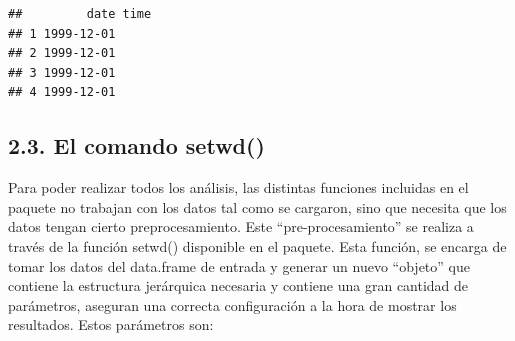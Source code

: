 \documentclass[]{article}
\begin{document}
\begin{verbatim}
##         date time
## 1 1999-12-01     
## 2 1999-12-01     
## 3 1999-12-01     
## 4 1999-12-01
\end{verbatim}

\subsection{2.3. El comando setwd()}\label{el-comando-setwd}

Para poder realizar todos los análisis, las distintas funciones
incluidas en el paquete no trabajan con los datos tal como se cargaron,
sino que necesita que los datos tengan cierto preprocesamiento. Este
``pre-procesamiento'' se realiza a través de la función setwd()
disponible en el paquete. Esta función, se encarga de tomar los datos
del data.frame de entrada y generar un nuevo ``objeto'' que contiene la
estructura jerárquica necesaria y contiene una gran cantidad de
parámetros, aseguran una correcta configuración a la hora de mostrar los
resultados. Estos parámetros son:
\end{document}
